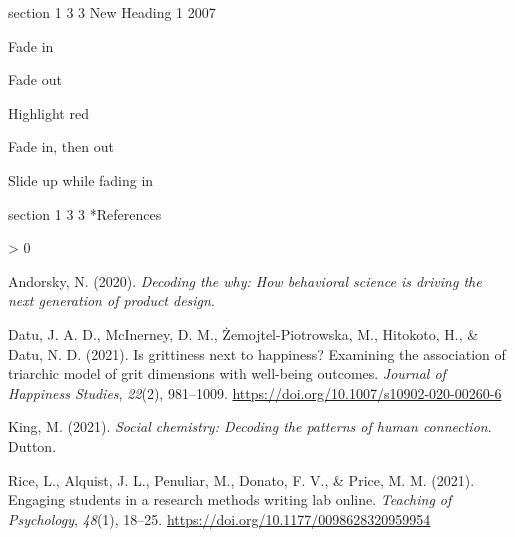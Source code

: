 \documentclass[12pt,
  a4paper,
  landscape]{article}
\makeatletter
\newlength{\cslhangindent}
\newenvironment{CSLReferences}[2] %
 {%
  \setlength{\parindent}{0pt}
  \ifodd #1 \everypar{\setlength{\hangindent}{\cslhangindent}}\ignorespaces\fi
  \ifnum #2 > 0
  \setlength{\parskip}{#2\baselineskip}
  \fi
 }%
 {}
\let\oldsection\section
\renewcommand\section{\clearpage\oldsection}
\renewcommand{\section}{\@startsection
{section}%
{1}%
{\z@}%
{3\baselineskip}%
{3\baselineskip}%
{\sffamily\huge\bfseries}} %
\makeatother
\begin{document}
\begin{center}

\hypertarget{new-heading-1-2007}{%
\section{New Heading 1 2007}\label{new-heading-1-2007}}

\end{center}

Fade in

\vfill

\begin{tcolorbox}[beforeafter skip=1cm, ignore nobreak=true, breakable, colframe=notes-frame, colback=notes-bg, coltext=notes-text, boxsep=2mm, arc=0mm, boxrule=0.5mm]

Fade out

\end{tcolorbox}

Highlight red

Fade in, then out

Slide up while fading in

\newpage

\vspace*{2.5cm}

\begin{center}

\hypertarget{references-1}{%
\section*{References}\label{references-1}}

\end{center}

\hypertarget{refs}{}
\begin{CSLReferences}{1}{0}
\leavevmode{}%
Andorsky, N. (2020). \emph{Decoding the why: How behavioral science is
driving the next generation of product design}.

\leavevmode{}%
Datu, J. A. D., McInerney, D. M., Żemojtel-Piotrowska, M., Hitokoto, H.,
\& Datu, N. D. (2021). Is grittiness next to happiness? Examining the
association of triarchic model of grit dimensions with well-being
outcomes. \emph{Journal of Happiness Studies}, \emph{22}(2), 981--1009.
\url{https://doi.org/10.1007/s10902-020-00260-6}

\leavevmode{}%
King, M. (2021). \emph{Social chemistry: Decoding the patterns of human
connection}. Dutton.

\leavevmode{}%
Rice, L., Alquist, J. L., Penuliar, M., Donato, F. V., \& Price, M. M.
(2021). Engaging students in a research methods writing lab online.
\emph{Teaching of Psychology}, \emph{48}(1), 18--25.
\url{https://doi.org/10.1177/0098628320959954}

\end{CSLReferences}
\end{document}
